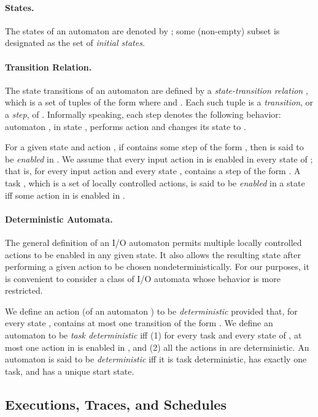 \documentclass[11pt]{article}
\numberwithin{theorem}{section}
\begin{document}
\paragraph{States.} 
The states of an automaton  are denoted by ; some
(non-empty) subset  is designated as the
set of \emph{initial states}. 

\paragraph{Transition Relation.}
The state transitions of an automaton  are defined by a
\emph{state-transition relation} , which is a set
of tuples of the form  where  and . 
Each such tuple  is a \emph{transition}, or a \emph{step},
of .
Informally speaking, each step  denotes the following
behavior:  automaton , in state , performs action  and
changes its state to . 

For a given state  and action , if  contains some step
of the form , then  is said to be \emph{enabled} in
. 
We assume that every input action in  is enabled in every state of
; that is, for every input action  and every state ,
 contains a step of the form .
A task , which is a set of locally controlled actions, is said to
be \emph{enabled} in a state  iff some action in  is enabled in
.

\paragraph{Deterministic Automata.}
The general definition of an I/O automaton permits multiple locally
controlled actions to be enabled in any given state. 
It also allows the resulting state after performing a given action to
be chosen nondeterministically. 
For our purposes, it is convenient to consider a class of I/O automata
whose behavior is more restricted. 

We define an action  (of an automaton ) to be
\emph{deterministic} provided that, for every state , 
contains at most one transition of the form .
We define an automaton  to be \emph{task deterministic} iff (1) for
every task  and every state  of , at most one action in 
is enabled in , and (2) all the actions in  are deterministic. 
An automaton is said to be \emph{deterministic} iff it
is task deterministic, has exactly one task, and has a unique start
state.

\subsection{Executions, Traces, and Schedules}
\end{document}
